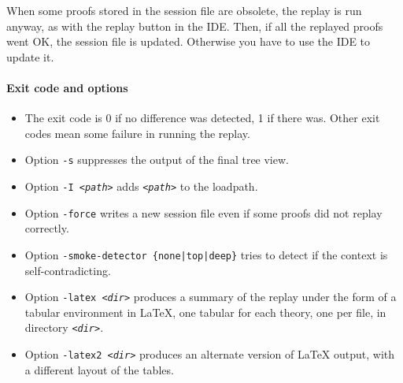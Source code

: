 When some proofs stored in the session file are obsolete, the replay is
run anyway, as with the replay button in the IDE. Then, if all the
replayed proofs went OK, the session file is updated. Otherwise you have
to use the IDE to update it.

\paragraph{Exit code and options}

\begin{itemize}
\item The exit code is 0 if no difference was detected, 1 if there
  was. Other exit codes mean some failure in running the replay.
\item Option \verb|-s| suppresses the output of the final tree view.
\item Option \texttt{-I \textsl{<path>}} adds \texttt{\textsl{<path>}} to the loadpath.
\item Option \verb|-force| writes a new session file even if
  some proofs did not replay correctly.
\item Option \texttt{-smoke-detector \{none|top|deep\}} tries to detect
  if the context is self-contradicting.
\item Option \texttt{-latex \textsl{<dir>}} produces a summary of
  the replay under the form of a tabular environment in LaTeX, one
  tabular for each theory, one per file, in directory \texttt{\textsl{<dir>}}.
\item Option \texttt{-latex2 \textsl{<dir>}} produces an alternate version of
  LaTeX output, with a different layout of the tables.
\end{itemize}

